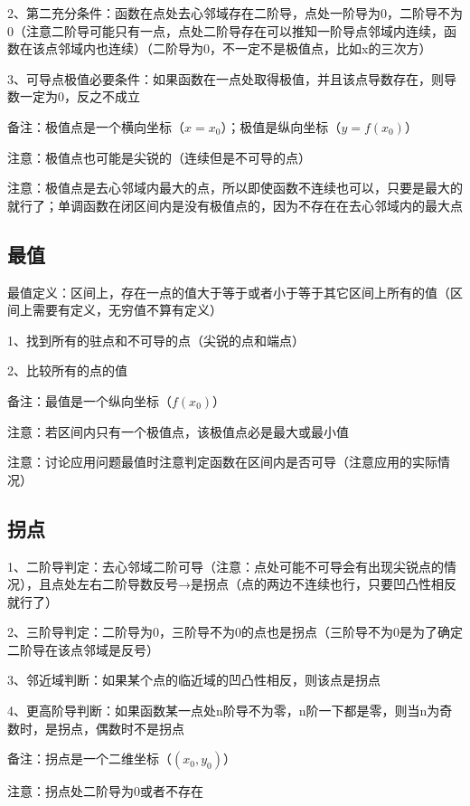 2、第二充分条件：函数在点处去心邻域存在二阶导，点处一阶导为0，二阶导不为0（注意二阶导可能只有一点，点处二阶导存在可以推知一阶导点邻域内连续，函数在该点邻域内也连续）（二阶导为0，不一定不是极值点，比如x的三次方）

3、可导点极值必要条件：如果函数在一点处取得极值，并且该点导数存在，则导数一定为0，反之不成立

备注：极值点是一个横向坐标（$x=x_0$）；极值是纵向坐标（$y=f(x_0)$）

注意：极值点也可能是尖锐的（连续但是不可导的点）

注意：极值点是去心邻域内最大的点，所以即使函数不连续也可以，只要是最大的就行了；单调函数在闭区间内是没有极值点的，因为不存在在去心邻域内的最大点



\subsection{最值}

最值定义：区间上，存在一点的值大于等于或者小于等于其它区间上所有的值（区间上需要有定义，无穷值不算有定义）

1、找到所有的驻点和不可导的点（尖锐的点和端点）

2、比较所有的点的值

备注：最值是一个纵向坐标（$f(x_0)$）

注意：若区间内只有一个极值点，该极值点必是最大或最小值

注意：讨论应用问题最值时注意判定函数在区间内是否可导（注意应用的实际情况）



\subsection{拐点}

1、二阶导判定：去心邻域二阶可导（注意：点处可能不可导会有出现尖锐点的情况），且点处左右二阶导数反号→是拐点（点的两边不连续也行，只要凹凸性相反就行了）

2、三阶导判定：二阶导为0，三阶导不为0的点也是拐点（三阶导不为0是为了确定二阶导在该点邻域是反号）

3、邻近域判断：如果某个点的临近域的凹凸性相反，则该点是拐点

4、更高阶导判断：如果函数某一点处n阶导不为零，n阶一下都是零，则当n为奇数时，是拐点，偶数时不是拐点

备注：拐点是一个二维坐标（$(x_0,y_0)$）

注意：拐点处二阶导为0或者不存在

